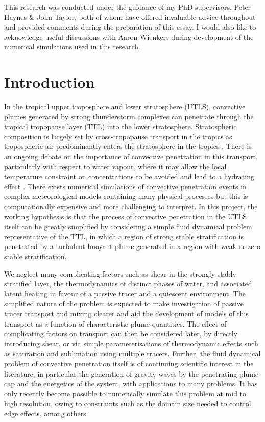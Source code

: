\documentclass[a4paper]{article}
\begin{document}
This research was conducted under the guidance of my PhD supervisors, Peter Haynes \& John Taylor, both of
whom have offered invaluable advice throughout and provided comments during the preparation of this
essay. I would also like to acknowledge useful discussions with Aaron Wienkers during development of
the numerical simulations used in this research.

\section{Introduction}

In the tropical upper troposphere and lower stratosphere (UTLS), convective plumes generated by strong
thunderstorm complexes can penetrate through the tropical tropopause layer (TTL) into the lower stratosphere.
Stratospheric composition is largely set by cross-tropopause transport in the tropics as tropospheric air
predominantly enters the stratosphere in the tropics \citep{fueglistaler2009}. There is an ongoing debate on
the importance of convective penetration in this transport, particularly with respect to water vapour, where
it may allow the local temperature constraint on concentrations to be avoided and lead to a hydrating effect
\citep{jensen2007}. There exists numerical simulations of convective penetration events in complex
meteorological models \citep{dauhut2015, dauhut2018} containing many physical processes but this is
computationally expensive and more challenging to interpret. In this project, the working hypothesis is that
the process of convective penetration in the UTLS itself can be greatly simplified by considering a simple
fluid dynamical problem representative of the TTL, in which a region of strong stable stratification is
penetrated by a turbulent buoyant plume generated in a region with weak or zero stable stratification.

We neglect many complicating factors such as shear in the strongly stably stratified layer, the thermodynamics
of distinct phases of water, and associated latent heating in favour of a passive tracer and a quiescent
environment. The simplified nature of the problem is expected to make investigation of passive tracer
transport and mixing clearer and aid the development of models of this transport as a function of
characteristic plume quantities. The effect of complicating factors on transport can then be considered later,
by directly introducing shear, or via simple parameterisations of thermodynamic effects such as saturation and
sublimation using multiple tracers. Further, the fluid dynamical problem of convective penetration itself is of continuing scientific
interest in the literature, in particular the generation of gravity waves by the penetrating plume cap and the
energetics of the system, with applications to many problems. It has only recently become possible to
numerically simulate this problem at mid to high resolution, owing to constraints such as the domain size
needed to control edge effects, among others.
\end{document}
